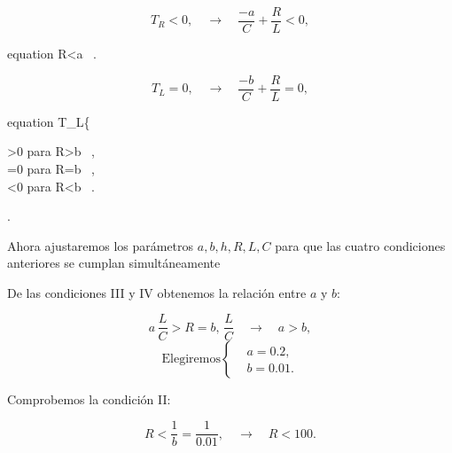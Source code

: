 \documentclass[12pt,a4paper]{report} %
\begin{document}
	\vspace{1cm}{\large\textbullet\quad Condición III}
	
	\begin{equation*}
		T_R<0, \quad \longrightarrow \quad \frac{-a}{C}+\frac{R}{L}<0,
	\end{equation*}\smallskip
	\begin{empheq}[box=\fbox]{equation}
		\label{eq:cond3}
		R<a \, .
	\end{empheq}
	
	\vspace{1cm}{\large\textbullet\quad Condición IV}
	
	\begin{equation*}
		T_L=0, \quad \longrightarrow \quad \frac{-b}{C}+\frac{R}{L}=0,
	\end{equation*}\smallskip
	\begin{empheq}[box=\fbox]{equation}
		\label{eq:cond4}
		T_L\left\{
		\begin{aligned}
			>0 \qquad para \quad R>b \, ,\\[3mm]
			=0 \qquad para \quad R=b \, ,\\[3mm]
			<0 \qquad para \quad R<b \, .
		\end{aligned}
		\right.
	\end{empheq}
	
	\newpage
	
	Ahora ajustaremos los parámetros $a,b,h,R,L,C$ para que las cuatro condiciones anteriores se cumplan simultáneamente
	
	\vspace{0.5cm}\noindent De las condiciones III y IV obtenemos la relación entre $a$ y $b$:
	
	\begin{equation*}
		a \, \frac{L}{C}>R=b, \, \frac{L}{C} \quad \longrightarrow \quad a>b,
	\end{equation*}\smallskip
	\begin{equation}
		\label{c1f}
		\text{Elegiremos}\left\{
		\begin{aligned}
			&a=0.2,\\[2mm]
			&b=0.01.
		\end{aligned}
		\right.
	\end{equation}
	
	\vspace{0.5cm}\noindent Comprobemos la condición II:
	
	\begin{equation*}
		R<\frac{1}{b}=\frac{1}{0.01}, \quad \longrightarrow \quad R<100.
	\end{equation*}\smallskip
	
\end{document}

